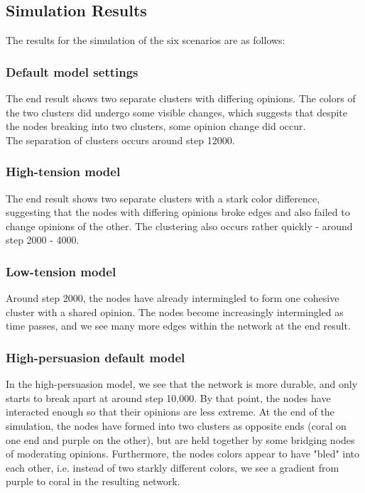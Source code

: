 \documentclass[11pt]{article}
\begin{document}
\subsection{Simulation Results}

The results for the simulation of the six scenarios are as follows:

\subsubsection*{Default model settings}

The end result shows two separate clusters with differing opinions. The
colors of the two clusters did undergo some visible changes, which
suggests that despite the nodes breaking into two clusters, some opinion
change did occur.\\

The separation of clusters occurs around step 12000.

\subsubsection*{High-tension model}

The end result shows two separate clusters with a stark color
difference, suggesting that the nodes with differing opinions broke
edges and also failed to change opinions of the other. The clustering
also occurs rather quickly - around step 2000 - 4000.

\subsubsection*{Low-tension model}

Around step 2000, the nodes have already intermingled to form one
cohesive cluster with a shared opinion. The nodes become increasingly
intermingled as time passes, and we see many more edges within the
network at the end result.

\subsubsection*{High-persuasion default model}

In the high-persuasion model, we see that the network is more durable,
and only starts to break apart at around step 10,000. By that point, the
nodes have interacted enough so that their opinions are less extreme. At
the end of the simulation, the nodes have formed into two clusters as
opposite ends (coral on one end and purple on the other), but are held
together by some bridging nodes of moderating opinions. Furthermore, the
nodes colors appear to have "bled" into each other, i.e. instead of two
starkly different colors, we see a gradient from purple to coral in the
resulting network.\\
\end{document}

